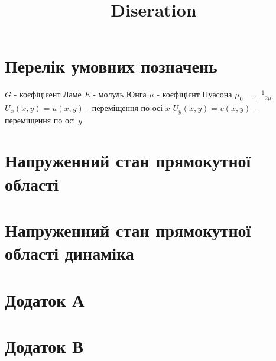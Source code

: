 \documentclass[a4paper,14pt]{extarticle}
\title{Diseration}
\author{}
\date{}
\numberwithin{equation}{section}
\begin{document}
\maketitle

\newpage

\renewcommand{\contentsname}{\centering Зміст}
\tableofcontents

\newpage

\section*{\centering Перелік умовних позначень}
$G$ - коєфіцієент Ламе \newline
$E$ - молуль Юнга \newline
$\mu$ - коєфіцієнт Пуасона \newline
$\mu_0 = \frac{1}{1 - 2\mu}$ \newline
$U_x(x,y) = u(x,y)$ - переміщення по осі $x$ \newline
$U_y(x,y) = v(x,y)$ - переміщення по осі $y$

\section{Напруженний стан прямокутної області}


\section{Напруженний стан прямокутної області динаміка}


\section{Додаток А}\label{ap_A_1}


\section{Додаток В}\label{ap_B_1}

\end{document}
